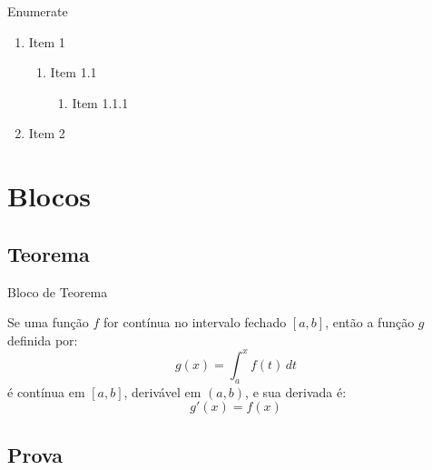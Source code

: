 \documentclass[aspectratio=169]{beamer}
\begin{document}
\begin{frame}{Enumerate}
    \begin{enumerate}
        \item Item 1
        \begin{enumerate}
            \item Item 1.1
            \begin{enumerate}
                \item Item 1.1.1
            \end{enumerate}
        \end{enumerate}
        \item Item 2
    \end{enumerate}
\end{frame}


\section{Blocos}

\subsection{Teorema}


\begin{frame}{Bloco de Teorema}
    
    \begin{theorem}
        Se uma função $f$ for contínua no intervalo fechado $[a, b]$, então a função $g$ definida por:
        $$g(x) = \int_{a}^{x} f(t) \, dt$$
        é contínua em $[a, b]$, derivável em $(a, b)$, e sua derivada é:
        $$g'(x) = f(x)$$
    \end{theorem}

\end{frame}

\subsection{Prova}
\end{document}
